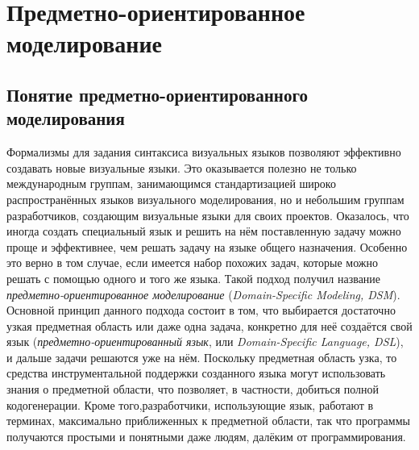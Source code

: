 \section{Предметно-ориентированное моделирование}
\subsection{Понятие предметно-ориентированного моделирования}
Формализмы для задания синтаксиса визуальных языков позволяют эффективно 
создавать новые визуальные языки. Это оказывается полезно не только 
международным группам, занимающимся стандартизацией широко распространённых 
языков визуального моделирования, но и небольшим группам разработчиков, 
создающим визуальные языки для своих проектов. Оказалось, что иногда создать 
специальный язык и решить на нём поставленную задачу можно проще и эффективнее, 
чем решать задачу на языке общего назначения. Особенно это верно в том случае, 
если имеется набор похожих задач, которые можно решать с помощью одного и того 
же языка. Такой подход получил название \textit{предметно-ориентированное моделирование} 
(\textit{Domain-Specific Modeling, DSM}). Основной принцип данного подхода состоит в том, 
что выбирается достаточно узкая предметная область или даже одна задача, 
конкретно для неё создаётся свой язык (\textit{предметно-ориентированный язык}, или 
\textit{Domain-Specific Language, DSL}), и дальше задачи решаются уже на нём. Поскольку 
предметная область узка, то средства инструментальной поддержки созданного языка 
могут использовать знания о предметной области, что позволяет, в частности, 
добиться полной кодогенерации. Кроме того,разработчики, использующие язык, 
работают в терминах, максимально приближенных к предметной области, так что 
программы получаются простыми и понятными даже людям, далёким от 
программирования.


